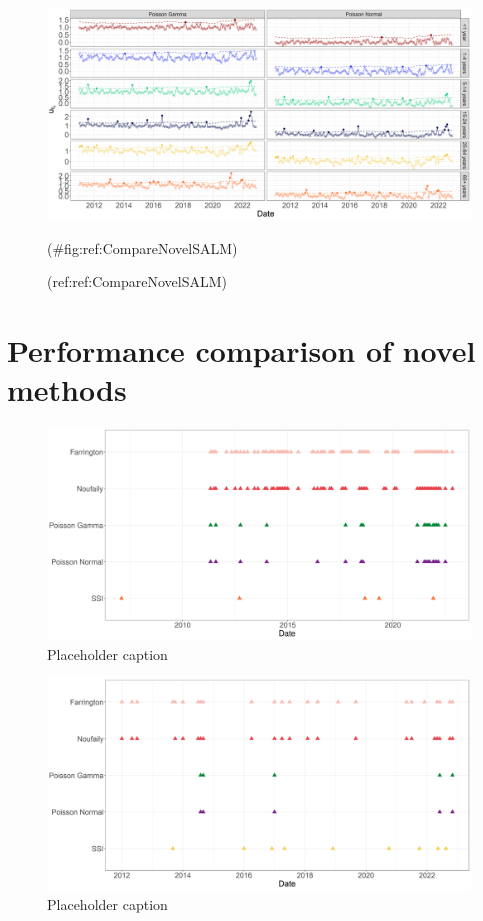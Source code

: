 \documentclass[a4paper,twoside,11pt]{report} %
\theoremstyle{definition}
\theoremstyle{definition}
\theoremstyle{definition}
\theoremstyle{definition}
\theoremstyle{remark}
\begin{document}
\begin{figure}[H]
\includegraphics[width=1\linewidth]{../figures/Compare_novel_SALM} \caption{(ref:ref:CompareNovelSALM)}(\#fig:ref:CompareNovelSALM)
\end{figure}

\section{Performance comparison of novel methods}



\begin{figure}[H]
\includegraphics[width=1\linewidth]{../figures/Compare_alarms_STEC} \caption{Placeholder caption}\label{fig:CompareAlarmsSTEC}
\end{figure}



\begin{figure}[H]
\includegraphics[width=1\linewidth]{../figures/Compare_alarms_LIST} \caption{Placeholder caption}\label{fig:CompareAlarmsLIST}
\end{figure}
\end{document}
